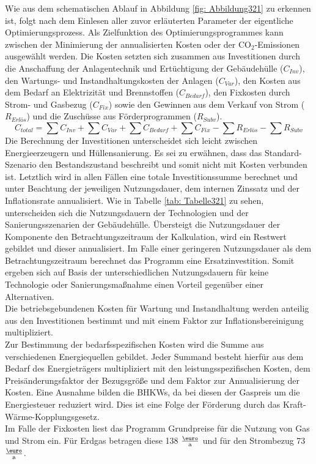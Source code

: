 Wie aus dem schematischen Ablauf in Abbildung \ref{fig: Abbildung321} zu erkennen ist, folgt nach dem Einlesen aller zuvor erläuterten Parameter der eigentliche Optimierungsprozess.
Als Zielfunktion des Optimierungsprogrammes kann zwischen der Minimierung der annualisierten Kosten oder der CO\(_2\)-Emissionen ausgewählt werden.
Die Kosten setzten sich zusammen aus Investitionen durch die Anschaffung der Anlagentechnik und Ertüchtigung der Gebäudehülle (\(C_{Inv}\)), den Wartungs- und Instandhaltungskosten der Anlagen (\(C_{Var}\)), den Kosten aus dem Bedarf an Elektrizität und Brennstoffen (\(C_{Bedarf}\)), den Fixkosten durch Strom- und Gasbezug (\(C_{Fix}\)) sowie den Gewinnen aus dem Verkauf von Strom (\(R_{Erlös}\)) und die Zuschüsse aus Förderprogrammen (\(R_{Subv}\)).
\begin{equation}
\label{eq:Gleichung321}
C_{total} = \sum C_{Inv} + \sum C_{Var} + \sum C_{Bedarf} + \sum C_{Fix} - \sum R_{Erlös} - \sum R_{Subv}  
\end{equation}
Die Berechnung der Investitionen unterscheidet sich leicht zwischen Energieerzeugern und Hüllensanierung.
Es sei zu erwähnen, dass das Standard-Szenario den Bestandszustand beschreibt und somit nicht mit Kosten verbunden ist.
Letztlich wird in allen Fällen eine totale Investitionssumme berechnet und unter Beachtung der jeweiligen Nutzungsdauer, dem internen Zinssatz und der Inflationsrate annualisiert.
Wie in Tabelle \ref{tab: Tabelle321} zu sehen, unterscheiden sich die Nutzungsdauern der Technologien und der Sanierungsszenarien der Gebäudehülle.
Übersteigt die Nutzungsdauer der Komponente den Betrachtungszeitraum der Kalkulation, wird ein Restwert gebildet und dieser annualisiert.
Im Falle einer geringeren Nutzungsdauer als dem Betrachtungszeitraum berechnet das Programm eine Ersatzinvestition.
Somit ergeben sich auf Basis der unterschiedlichen Nutzungsdauern für keine Technologie oder Sanierungsmaßnahme einen Vorteil gegenüber einer Alternativen.\\
Die betriebsgebundenen Kosten für Wartung und Instandhaltung werden anteilig aus den Investitionen bestimmt und mit einem Faktor zur Inflationsbereinigung multipliziert.\\
Zur Bestimmung der bedarfsspezifischen Kosten wird die Summe aus verschiedenen Energiequellen gebildet. Jeder Summand besteht hierfür aus dem Bedarf des Energieträgers multipliziert mit den leistungsspezifischen Kosten, dem Preisänderungsfaktor der Bezugsgröße und dem Faktor zur Annualisierung der Kosten. 
Eine Ausnahme bilden die BHKWs, da bei diesen der Gaspreis um die Energiesteuer reduziert wird.
Dies ist eine Folge der Förderung durch das Kraft-Wärme-Kopplungsgesetz.\\
Im Falle der Fixkosten liest das Programm Grundpreise für die Nutzung von Gas und Strom ein.
Für Erdgas betragen diese 138 \(\frac{\text{\euro}}{\text{a}}\) und für den Strombezug 73 \(\frac{\text{\euro}}{\text{a}}\). \\

